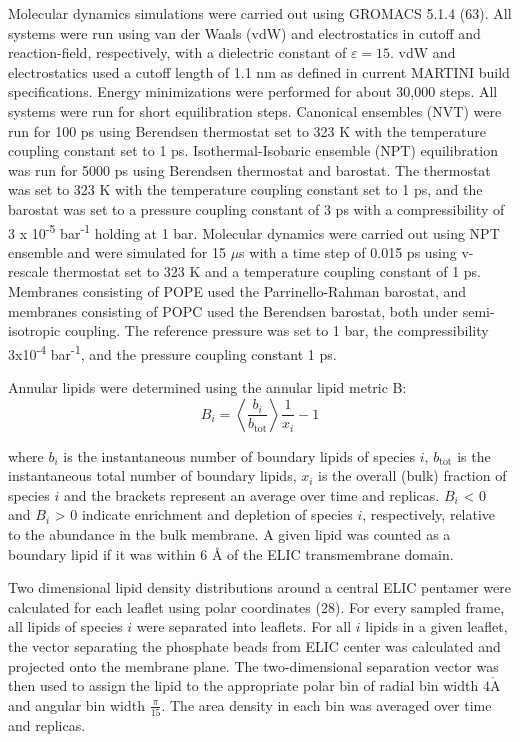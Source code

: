 Molecular dynamics simulations were carried out using GROMACS 5.1.4
(63). All systems were run using van der Waals (vdW) and electrostatics
in cutoff and reaction-field, respectively, with a dielectric constant
of \(\varepsilon = 15\). vdW and electrostatics used a cutoff length of
1.1 nm as defined in current MARTINI build specifications. Energy
minimizations were performed for about 30,000 steps. All systems were
run for short equilibration steps. Canonical ensembles (NVT) were run
for 100 ps using Berendsen thermostat set to 323 K with the temperature
coupling constant set to 1 ps. Isothermal-Isobaric ensemble (NPT)
equilibration was run for 5000 ps using Berendsen thermostat and
barostat. The thermostat was set to 323 K with the temperature coupling
constant set to 1 ps, and the barostat was set to a pressure coupling
constant of 3 ps with a compressibility of 3 x 10\textsuperscript{-5}
bar\textsuperscript{-1} holding at 1 bar. Molecular dynamics were
carried out using NPT ensemble and were simulated for 15 $\mu$s with a time
step of 0.015 ps using v-rescale thermostat set to 323 K and a
temperature coupling constant of 1 ps. Membranes consisting of POPE used
the Parrinello-Rahman barostat, and membranes consisting of POPC used
the Berendsen barostat, both under semi-isotropic coupling. The
reference pressure was set to 1 bar, the compressibility
3x10\textsuperscript{-4} bar\textsuperscript{-1}, and the pressure
coupling constant 1 ps.

Annular lipids were determined using the annular lipid metric B:
\begin{equation}
B_{i} = \left\langle \frac{b_{i}}{b_{\text{tot}}} \right\rangle\frac{1}{x_{i}} - 1
\end{equation}

where \(b_{i}\) is the instantaneous number of boundary lipids of
species \(i\), \(b_{\text{tot}}\) is the instantaneous total number of
boundary lipids, \(x_{i}\) is the overall (bulk) fraction of species
\(i\) and the brackets represent an average over time and replicas.
\(B_{i}\) \textless{} 0 and \(B_{i}\) \textgreater{} 0 indicate
enrichment and depletion of species \(i\), respectively, relative to the
abundance in the bulk membrane. A given lipid was counted as a boundary
lipid if it was within 6 Å of the ELIC transmembrane domain.

Two dimensional lipid density distributions around a central ELIC
pentamer were calculated for each leaflet using polar coordinates (28).
For every sampled frame, all lipids of species \(i\) were separated into
leaflets. For all \(i\) lipids in a given leaflet, the vector separating
the phosphate beads from ELIC center was calculated and projected onto
the membrane plane. The two-dimensional separation vector was then used
to assign the lipid to the appropriate polar bin of radial bin width
\(4\mathring{\mathrm{A}}\) and angular bin width
\(\frac{\pi}{15}\text{.\ }\)The area density in each bin was averaged
over time and replicas.

